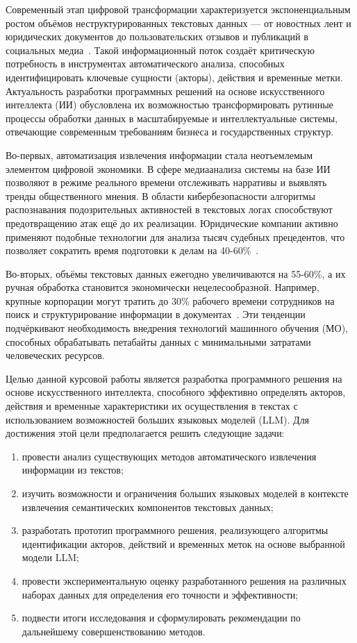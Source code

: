 
Современный этап цифровой трансформации характеризуется экспоненциальным ростом объёмов неструктурированных текстовых данных — 
от новостных лент и юридических документов до пользовательских отзывов и публикаций в социальных медиа \cite{intro:1}. 
Такой информационный поток создаёт критическую потребность в инструментах автоматического анализа, 
способных идентифицировать ключевые сущности (акторы), действия и временные метки. 
Актуальность разработки программных решений на основе искусственного интеллекта (ИИ) обусловлена 
их возможностью трансформировать рутинные процессы обработки данных в масштабируемые и интеллектуальные системы, 
отвечающие современным требованиям бизнеса и государственных структур.

Во-первых, автоматизация извлечения информации стала неотъемлемым элементом цифровой экономики. 
В сфере медиаанализа системы на базе ИИ позволяют в режиме реального времени отслеживать нарративы и выявлять тренды общественного мнения. 
В области кибербезопасности алгоритмы распознавания подозрительных активностей в текстовых логах способствуют предотвращению атак ещё до их реализации. 
Юридические компании активно применяют подобные технологии для анализа тысяч судебных прецедентов, что позволяет сократить время подготовки к делам на 40-60\% \cite{intro:2}.

Во-вторых, объёмы текстовых данных ежегодно увеличиваются на 55-60\%, а их ручная обработка становится экономически нецелесообразной. 
Например, крупные корпорации могут тратить до 30\% рабочего времени сотрудников на поиск и структурирование информации в документах \cite{intro:3}.
Эти тенденции подчёркивают необходимость внедрения технологий машинного обучения (МО), способных обрабатывать петабайты данных с минимальными затратами человеческих ресурсов.

Целью данной курсовой работы является разработка программного решения на основе искусственного интеллекта, 
способного эффективно определять акторов, действия и временные характеристики их осуществления в текстах с использованием возможностей больших языковых моделей (LLM).
Для достижения этой цели предполагается решить следующие задачи:
\begin{enumerate}
    \item провести анализ существующих методов автоматического извлечения информации из текстов;
    \item изучить возможности и ограничения больших языковых моделей в контексте извлечения семантических компонентов текстовых данных;
    \item разработать прототип программного решения, реализующего алгоритмы идентификации акторов, действий и временных меток на основе выбранной модели LLM;
    \item провести экспериментальную оценку разработанного решения на различных наборах данных для определения его точности и эффективности;
    \item подвести итоги исследования и сформулировать рекомендации по дальнейшему совершенствованию методов.
\end{enumerate}

\clearpage
